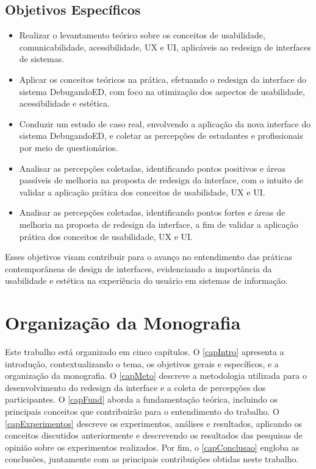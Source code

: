 \subsection{Objetivos Específicos}
\begin{itemize}
    \item Realizar o levantamento teórico sobre os conceitos de usabilidade, comunicabilidade, acessibilidade, \ac{UX} e \ac{UI}, aplicáveis ao redesign de interfaces de sistemas.
    \item Aplicar os conceitos teóricos na prática, efetuando o redesign da interface do sistema DebugandoED, com foco na otimização dos aspectos de usabilidade, acessibilidade e estética.
    \item Conduzir um estudo de caso real, envolvendo a aplicação da nova interface do sistema DebugandoED, e coletar as percepções de estudantes e profissionais por meio de questionários.
    \item Analisar as percepções coletadas, identificando pontos positivos e áreas passíveis de melhoria na proposta de redesign da interface, com o intuito de validar a aplicação prática dos conceitos de usabilidade, \ac{UX} e \ac{UI}.
    \item Analisar as percepções coletadas, identificando pontos fortes e áreas de melhoria na proposta de redesign da interface, a fim de validar a aplicação prática dos conceitos de usabilidade, \ac{UX} e \ac{UI}.

\end{itemize}

Esses objetivos visam contribuir para o avanço no entendimento das práticas contemporâneas de design de interfaces, evidenciando a importância da usabilidade e estética na experiência do usuário em sistemas de informação.

\section{Organização da Monografia}

Este trabalho está organizado em cinco capítulos. O \autoref{capIntro} apresenta a introdução, contextualizando o tema, os objetivos gerais e específicos, e a organização da monografia. O \autoref{capMeto} descreve a metodologia utilizada para o desenvolvimento do redesign da interface e a coleta de percepções dos participantes. O \autoref{capFund} aborda a fundamentação teórica, incluindo os principais conceitos que contribuirão para o entendimento do trabalho. O \autoref{capExperimentos} descreve os experimentos, análises e resultados, aplicando os conceitos discutidos anteriormente e descrevendo os resultados das pesquisas de opinião sobre os experimentos realizados. Por fim, o \autoref{capConclusao} engloba as conclusões, juntamente com as principais contribuições obtidas neste trabalho.
